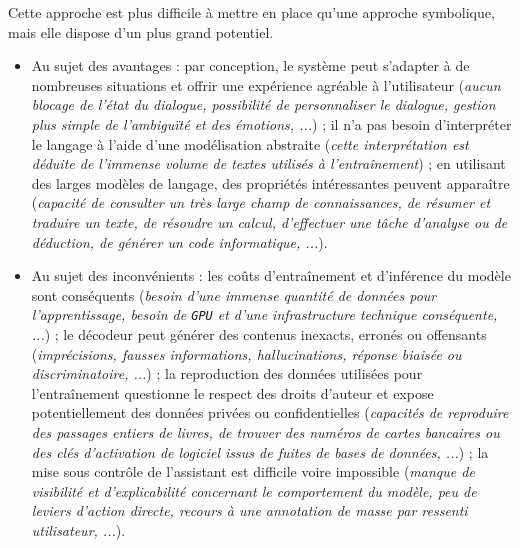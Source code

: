 			
			Cette approche est plus difficile à mettre en place qu'une approche symbolique, mais elle dispose d'un plus grand potentiel.
			\begin{itemize}
				\item[\textcolor{colorDarkPastelGreen}{\textcolor{colorDarkPastelGreen}{\faThumbsUp}}] Au sujet des avantages :
					par conception, le système peut s'adapter à de nombreuses situations et offrir une expérience agréable à l'utilisateur
					(\textit{aucun blocage de l'état du dialogue, possibilité de personnaliser le dialogue, gestion plus simple de l'ambiguïté et des émotions, ...}) ;
					il n'a pas besoin d'interpréter le langage à l'aide d'une modélisation abstraite
					(\textit{cette interprétation est déduite de l'immense volume de textes utilisés à l'entraînement}) ;
					en utilisant des larges modèles de langage, des propriétés intéressantes peuvent apparaître
					(\textit{capacité de consulter un très large champ de connaissances, de résumer et traduire un texte, de résoudre un calcul, d'effectuer une tâche d'analyse ou de déduction, de générer un code informatique, ...}).
				\item[\textcolor{colorDarkPastelRed}{\textcolor{colorDarkPastelRed}{\faThumbsDown}}] Au sujet des inconvénients :
					les coûts d'entraînement et d'inférence du modèle sont conséquents
					(\textit{besoin d'une immense quantité de données pour l'apprentissage, besoin de \texttt{GPU} et d'une infrastructure technique conséquente, ...}) ;
					le décodeur peut générer des contenus inexacts, erronés ou offensants
					(\textit{imprécisions, fausses informations, hallucinations, réponse biaisée ou discriminatoire, ...}) ;
					la reproduction des données utilisées pour l'entraînement questionne le respect des droits d'auteur et expose potentiellement des données privées ou confidentielles
					(\textit{capacités de reproduire des passages entiers de livres, de trouver des numéros de cartes bancaires ou des clés d'activation de logiciel issus de fuites de bases de données, ...}) ;
					la mise sous contrôle de l'assistant est difficile voire impossible
					(\textit{manque de visibilité et d'explicabilité concernant le comportement du modèle, peu de leviers d'action directe, recours à une annotation de masse par ressenti utilisateur, ...}).
			\end{itemize}
			
